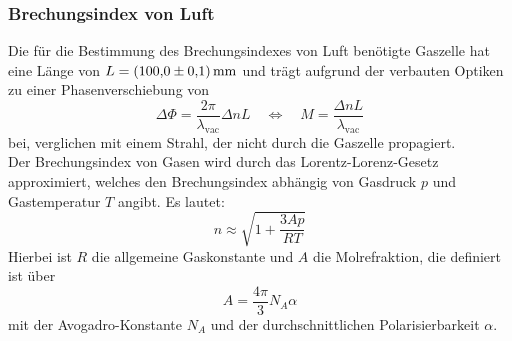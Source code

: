 \subsubsection{Brechungsindex von Luft}
Die für die Bestimmung des Brechungsindexes von Luft benötigte Gaszelle hat eine Länge von $L = \SI{100.0\pm0.1}{\milli\metre}$ und trägt aufgrund der verbauten Optiken zu einer Phasenverschiebung von
\begin{equation}
    \Delta\Phi = \frac{2\pi}{\lambda_{\text{vac}}}\Delta nL \quad \iff \quad M = \frac{\Delta nL}{\lambda_{\text{vac}}}
    \label{eq:gasphase}
\end{equation}
bei, verglichen mit einem Strahl, der nicht durch die Gaszelle propagiert.\\
Der Brechungsindex von Gasen wird durch das Lorentz-Lorenz-Gesetz approximiert, welches den Brechungsindex abhängig von Gasdruck $p$ und Gastemperatur $T$ angibt.
Es lautet:
\begin{equation}
    n \approx \sqrt{1 + \frac{3Ap}{RT}}
    \label{eq:lorentz}
\end{equation}
Hierbei ist $R$ die allgemeine Gaskonstante und $A$ die Molrefraktion, die definiert ist über
\begin{equation}
    A = \frac{4\pi}{3}N_A\alpha
\end{equation}
mit der Avogadro-Konstante $N_A$ und der durchschnittlichen Polarisierbarkeit $\alpha$.